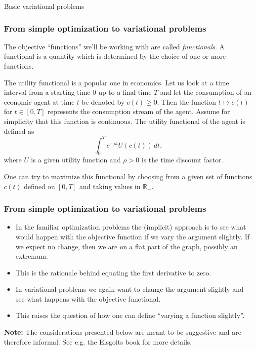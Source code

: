 \documentclass[10pt]{beamer}
\theoremstyle{definition}
\begin{document}
\begin{section}{Basic variational problems}\label{sec:CoV}

\begin{frame}[fragile]
\frametitle{From simple optimization to variational problems}
The objective ``functions'' we'll be working with are called \emph{functionals}. A functional is a quantity which is determined by the choice of one or more functions.\bigskip

\begin{example}
The utility functional is a popular one in economics. Let us look at a time interval from a starting time $ 0 $ up to a final time $ T $ and let the consumption of an economic agent at time $ t $ be denoted by $ c(t) \geq 0$. Then the function $ t \mapsto c(t)$ for $ t\in [0,T] $ represents the consumption stream of the agent. Assume for simplicity that this function is continuous. The utility functional of the agent is defined as \[ \int_{0}^{T} e^{-\rho t} U(c(t))\,dt, \] where $ U $ is a given utility function and $ \rho>0 $ is the time discount factor.

One can try to maximize this functional by choosing from a given set of functions $ c(t) $ defined on $ [0,T] $ and taking values in $ \mathbb{R}_{+} $.
\label{ex:Ufnl}
\end{example}
\end{frame}

\begin{frame}[fragile]
\frametitle{From simple optimization to variational problems}
\begin{itemize}\itemsep1em
\item In the familiar optimization problems the (implicit) approach is to see what would happen with the objective function if we vary the argument slightly. If we expect no change, then we are on a flat part of the graph, possibly an extremum.
\item This is the rationale behind equating the first derivative to zero.
\item In variational problems we again want to change the argument slightly and see what happens with the objective functional.
\item This raises the question of how one can define ``varying a function slightly''.
\end{itemize}

\textbf{Note:} The considerations presented below are meant to be suggestive and are therefore informal. See e.g. the Elsgolts book for more details.
\end{frame}


\end{section}
\end{document}
